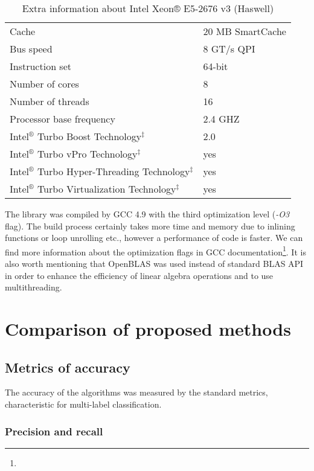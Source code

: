 \begin{table}[h]
\centering
\caption{Extra information about Intel Xeon® E5-2676 v3 (Haswell)}
\label{tab:cpu}
    \begin{tabular}{l|l}
    & \\ \hline \hline
    Cache & 20 MB SmartCache \\
    Bus speed & 8 GT/s QPI \\
    Instruction set & 64-bit \\
    Number of cores & 8 \\
    Number of threads & 16 \\
    Processor base frequency & 2.4 GHZ \\
    Intel$^{®}$ Turbo Boost Technology$^{‡}$ & 2.0 \\
    Intel$^{®}$ Turbo vPro Technology$^{‡}$ & yes \\ 
    Intel$^{®}$ Turbo Hyper-Threading Technology$^{‡}$ & yes \\
    Intel$^{®}$ Turbo Virtualization Technology$^{‡}$ & yes
    \end{tabular}
\end{table}

The library was compiled by GCC 4.9 with the third optimization level (\textit{-O3} flag). The build process certainly takes more time and memory due to inlining functions or loop unrolling etc., however a performance of code is faster. We can find more information about the optimization flags in GCC documentation\footnote{}. It is also worth mentioning that OpenBLAS was used instead of standard BLAS API in order to enhance the efficiency of linear algebra operations and to use multithreading. 

\section{Comparison of proposed methods}
\subsection{Metrics of accuracy}

The accuracy of the algorithms was measured by the standard metrics, characteristic for multi-label classification.

\subsubsection{Precision and recall} 

